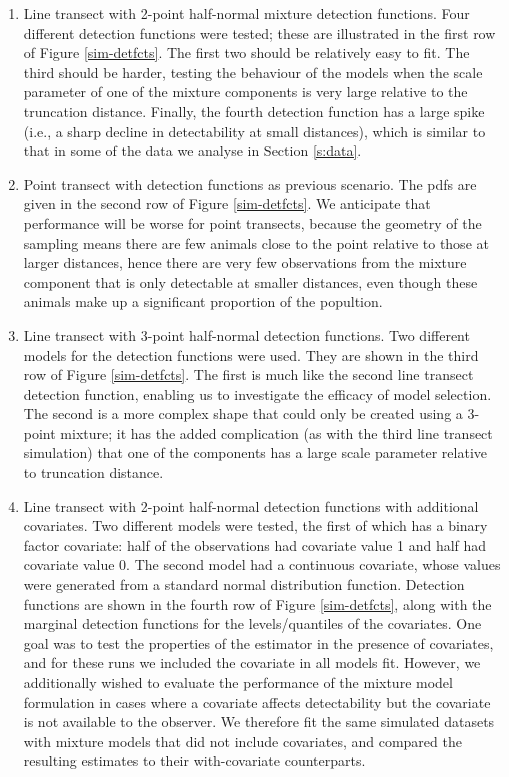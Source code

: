 \documentclass[useAMS,referee]{biom}
\begin{document}
\begin{enumerate}
	\item Line transect with 2-point half-normal mixture detection functions. Four different detection functions were tested; these are illustrated in the first row of Figure \ref{sim-detfcts}. The first two should be relatively easy to fit. The third should be harder, testing the behaviour of the models when the scale parameter of one of the mixture components is very large relative to the truncation distance. Finally, the fourth detection function has a large spike (i.e., a sharp decline in detectability at small distances), which is similar to that in some of the data we analyse in Section \ref{s:data}.
	\item Point transect with detection functions as previous scenario. The pdfs are given in the second row of Figure \ref{sim-detfcts}.  We anticipate that performance will be worse for point transects, because the geometry of the sampling means there are few animals close to the point relative to those at larger distances, hence there are very few observations from the mixture component that is only detectable at smaller distances, even though these animals make up a significant proportion of the popultion.
	\item Line transect with 3-point half-normal detection functions. Two different models for the detection functions were used. They are shown in the third row of Figure \ref{sim-detfcts}. The first is much like the second line transect detection function, enabling us to investigate the efficacy of model selection. The second is a more complex shape that could only be created using a 3-point mixture; it has the added complication (as with the third line transect simulation) that one of the components has a large scale parameter relative to truncation distance.
	\item Line transect with 2-point half-normal detection functions with additional covariates. Two different models were tested, the first of which has a binary factor covariate: half of the observations had covariate value 1 and half had covariate value 0. The second model had a continuous covariate, whose values were generated from a standard normal distribution function. Detection functions are shown in the fourth row of Figure \ref{sim-detfcts}, along with the marginal detection functions for the levels/quantiles of the covariates. One goal was to test the properties of the estimator in the presence of covariates, and for these runs we included the covariate in all models fit.  However, we additionally wished to evaluate the performance of the mixture model formulation in cases where a covariate affects detectability but the covariate is not available to the observer.  We therefore fit the same simulated datasets with mixture models that did not include covariates, and compared the resulting estimates to their with-covariate counterparts.

\end{enumerate}
\end{document}
